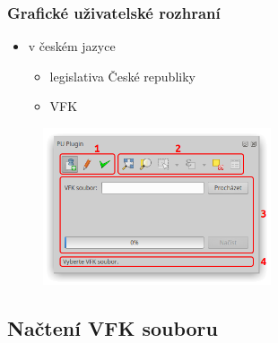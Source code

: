\documentclass{beamer}
\begin{document}
\begin{frame}

\frametitle{Grafické uživatelské rozhraní}

\begin{itemize}
	\item v českém jazyce
	\begin{itemize}
		\item legislativa České republiky
		\item VFK
	\end{itemize}
\end{itemize}

\begin{figure}[ht]
	\includegraphics[width=0.6\textwidth]{pictures/main_gui.png}
\end{figure}

\end{frame}


\subsection{Načtení VFK souboru}
\end{document}
